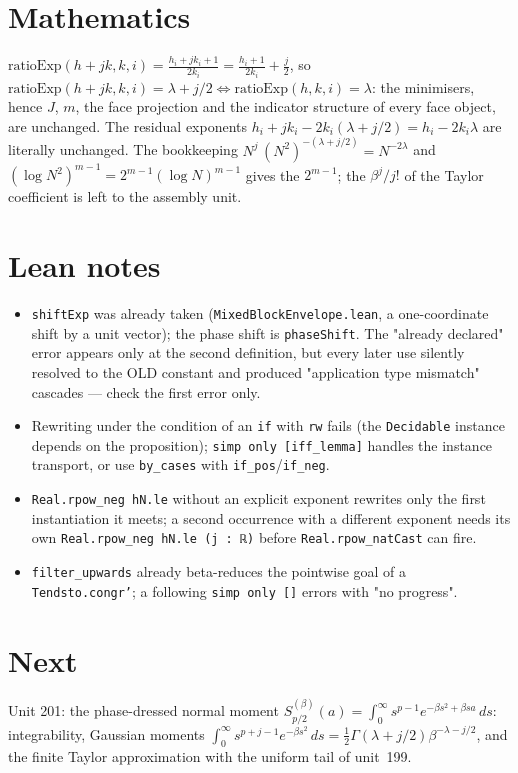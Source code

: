 \documentclass[11pt]{article}
\begin{document}
\section{Mathematics}
$\mathrm{ratioExp}(h+jk,k,i)=\frac{h_i+jk_i+1}{2k_i}=\frac{h_i+1}{2k_i}+\frac j2$, so
$\mathrm{ratioExp}(h+jk,k,i)=\lambda+j/2\iff\mathrm{ratioExp}(h,k,i)=\lambda$: the minimisers, hence
$J$, $m$, the face projection and the indicator structure of every face object, are unchanged. The
residual exponents $h_i+jk_i-2k_i(\lambda+j/2)=h_i-2k_i\lambda$ are literally unchanged. The
bookkeeping $N^j\,(N^2)^{-(\lambda+j/2)}=N^{-2\lambda}$ and $(\log N^2)^{m-1}=2^{m-1}(\log N)^{m-1}$
gives the $2^{m-1}$; the $\beta^j/j!$ of the Taylor coefficient is left to the assembly unit.

\section{Lean notes}
\begin{itemize}
\item \texttt{shiftExp} was already taken (\texttt{MixedBlockEnvelope.lean}, a one-coordinate shift
  by a unit vector); the phase shift is \texttt{phaseShift}. The "already declared" error appears
  only at the second definition, but every later use silently resolved to the OLD constant and
  produced "application type mismatch" cascades --- check the first error only.
\item Rewriting under the condition of an \texttt{if} with \texttt{rw} fails (the
  \texttt{Decidable} instance depends on the proposition); \texttt{simp only [iff\_lemma]} handles
  the instance transport, or use \texttt{by\_cases} with \texttt{if\_pos}/\texttt{if\_neg}.
\item \texttt{Real.rpow\_neg hN.le} without an explicit exponent rewrites only the first
  instantiation it meets; a second occurrence with a different exponent needs its own
  \texttt{Real.rpow\_neg hN.le (j : ℝ)} before \texttt{Real.rpow\_natCast} can fire.
\item \texttt{filter\_upwards} already beta-reduces the pointwise goal of a
  \texttt{Tendsto.congr'}; a following \texttt{simp only []} errors with "no progress".
\end{itemize}

\section{Next}
Unit 201: the phase-dressed normal moment $S^{(\beta)}_{p/2}(a)=\int_0^\infty s^{p-1}e^{-\beta s^2+\beta sa}\,ds$:
integrability, Gaussian moments $\int_0^\infty s^{p+j-1}e^{-\beta s^2}\,ds=\tfrac12\Gamma(\lambda+j/2)\beta^{-\lambda-j/2}$,
and the finite Taylor approximation with the uniform tail of unit~199.
\end{document}
